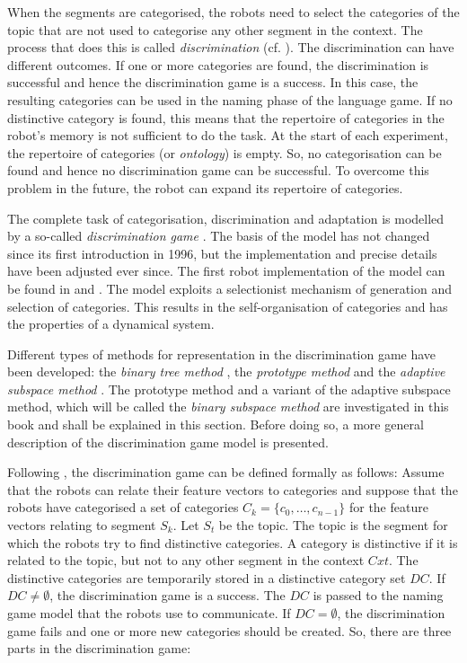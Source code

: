 When the segments are categorised, the robots need to select the categories of the topic that are not used to categorise any other segment in the context. The process that does this is called {\em discrimination} (cf. \citealt{steels:1996b}). The discrimination can have different outcomes. If one or more categories are found, the discrimination is successful and hence the discrimination game is a success. In this case, the resulting categories can be used in the naming phase of the language game. If no distinctive category is found, this means that the repertoire of categories in the robot's memory is not sufficient to do the task.  At the start of each experiment, the repertoire of categories (or {\em ontology}) is empty. So, no categorisation can be found and hence no discrimination game can be successful. To overcome this problem in the future, the robot can expand its repertoire of categories.

The complete task of categorisation, discrimination and adaptation is modelled by a so-called {\em discrimination game} \citep{steels:1996b}. The basis of the model has not changed since its first introduction in 1996, but the implementation and precise details have been adjusted ever since. The first robot implementation of the model can be found in \citealt{steelsvogt:1997} and \citealt{vogt:1998a}. The model exploits a selectionist mechanism of generation and selection of categories. This results in the self-organisation of categories and has the properties of a dynamical system.

Different types of methods for representation in the discrimination game have been developed: the {\em binary tree method} \citep{steels:1996b}, the {\em prototype method} \citep{dejongvogt:1998,vogt:1998b} and the {\em adaptive subspace method} \citep{dejongvogt:1998,dejong:2000}. The prototype method and a variant of the adaptive subspace method, which will be called the {\em binary subspace method} are investigated in this book and shall be explained in this section. Before doing so, a more general description of the discrimination game model is presented.


Following \citet{steels:1996b}, the discrimination game can be defined formally as follows: Assume that the robots can relate their feature vectors to categories and suppose that the robots have categorised a set of categories $C_k=\{c_0,\ldots,c_{n-1}\}$ for the feature vectors relating to segment $S_k$. Let $S_t$ be the topic. The topic is the segment for which the robots try to find distinctive categories. A category is distinctive if it is related to the topic, but not to any other segment in the context $Cxt$. The distinctive categories are temporarily stored in a distinctive category set $DC$. If $DC \neq \emptyset$, the discrimination game is a success. The $DC$ is passed to the naming game model that the robots use to communicate. If $DC=\emptyset$, the discrimination game fails and one or more new categories should be created. So, there are three parts in the discrimination game:

